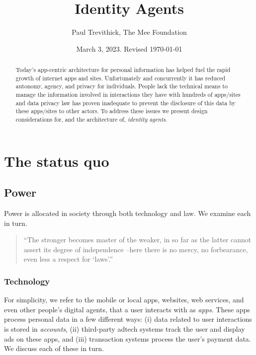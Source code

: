 \documentclass[11pt, oneside]{article}   	%
\title{Identity Agents}
\author{Paul Trevithick, The Mee Foundation}
\date{March 3, 2023. Revised \today}
\begin{document}
\maketitle
\begin{abstract}
Today's app-centric architecture for personal information has helped fuel the rapid growth of internet apps and sites. Unfortunately and concurrently it has reduced autonomy, agency, and privacy for individuals. People lack the technical means to manage the information involved in interactions they have with hundreds of apps/sites and data privacy law has proven inadequate to prevent the disclosure of this data by these apps/sites to other actors. To address these issues we present design considerations for, and the architecture of, \emph{identity agents}.
\end{abstract}


\section{The status quo} %

\subsection{Power}

Power is allocated in society through both technology and law. We examine each in turn.

\begin{quote}
	``The stronger becomes master of the weaker, in so far as the latter cannot assert its degree of independence --here there is no mercy, no forbearance, even less a respect for `laws'.''\cite{Nietzsche1901}
\end{quote}

\subsubsection{Technology}
For simplicity, we refer to the mobile or local apps, websites, web services, and even other people's digital agents, that a user interacts with as \emph{apps}. These apps process personal data in a few different ways: (i) data related to user interactions is stored in \emph{accounts}, (ii) third-party adtech systems track the user and display ads on these apps, and (iii) transaction systems process the user's payment data. We discuss each of these in turn.
\end{document}
